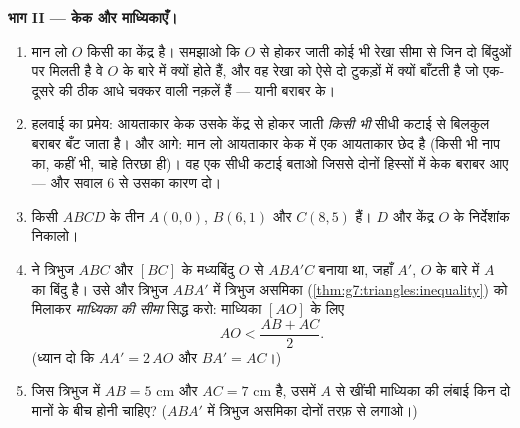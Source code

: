 \begin{problem}
\medskip
\noindent\textbf{भाग II --- केक और माध्यिकाएँ।}
\begin{enumerate}[resume]
  \item मान लो $O$ किसी  का केंद्र है। समझाओ कि
        $O$ से होकर जाती कोई भी रेखा सीमा से जिन दो बिंदुओं पर
        मिलती है वे $O$ के बारे में  क्यों होते हैं, और वह
        रेखा  को ऐसे दो टुकड़ों में क्यों बाँटती
        है जो एक-दूसरे की ठीक आधे चक्कर वाली नक़लें हैं --- यानी
        बराबर  के।
  \item हलवाई का प्रमेय: आयताकार केक उसके केंद्र से होकर जाती
        \emph{किसी भी} सीधी कटाई से बिलकुल बराबर बँट जाता है।
        और आगे: मान लो आयताकार केक में एक आयताकार छेद है (किसी
        भी नाप का, कहीं भी, चाहे तिरछा ही)। वह एक सीधी कटाई बताओ
        जिससे दोनों हिस्सों में केक बराबर आए --- और सवाल 6 से
        उसका कारण दो।
  \item किसी  $ABCD$ के तीन  $A(0, 0)$,
        $B(6, 1)$ और $C(8, 5)$ हैं। $D$ और केंद्र $O$ के
        निर्देशांक निकालो।
  \item {} ने त्रिभुज $ABC$ और $[BC]$ के
        मध्यबिंदु $O$ से  $ABA'C$ बनाया था, जहाँ
        $A'$, $O$ के बारे में $A$ का  बिंदु है। उसे और
        त्रिभुज $ABA'$ में त्रिभुज असमिका
        (\cref{thm:g7:triangles:inequality}) को मिलाकर
        \emph{माध्यिका की सीमा} सिद्ध करो: माध्यिका $[AO]$ के
        लिए
        \[
        AO < \frac{AB + AC}{2} .
        \]
        (ध्यान दो कि $AA' = 2\,AO$ और $BA' = AC$।)
  \item जिस त्रिभुज में $AB = 5$ cm और $AC = 7$ cm है, उसमें $A$
        से खींची माध्यिका की लंबाई किन दो मानों के बीच होनी
        चाहिए? ($ABA'$ में त्रिभुज असमिका दोनों तरफ़ से लगाओ।)
\end{enumerate}


\end{problem}
